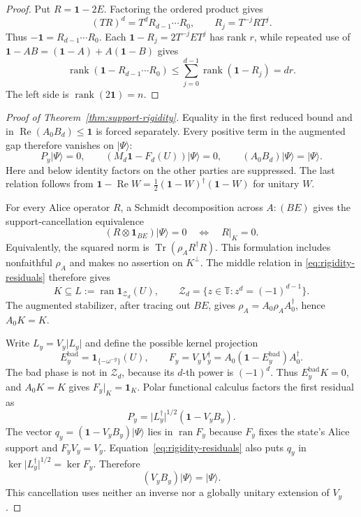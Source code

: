 \documentclass[11pt]{article}
\theoremstyle{definition}
\theoremstyle{remark}
\newcommand{\Id}{\mathbf 1}
\newcommand{\Reop}{\operatorname{Re}}
\newcommand{\Tr}{\operatorname{Tr}}
\newcommand{\rankop}{\operatorname{rank}}
\newcommand{\bbT}{\mathbb T}
\newcommand{\absop}[1]{\lvert #1\rvert}
\begin{document}
\begin{proof}
Put \(R=\Id-2E\).  Factoring the ordered product gives
\[
 (TR)^d=T^dR_{d-1}\cdots R_0,
 \qquad R_j=T^{-j}RT^j.
\]
Thus \(-\Id=R_{d-1}\cdots R_0\).  Each
\(\Id-R_j=2T^{-j}ET^j\) has rank \(r\), while repeated use of
\(\Id-AB=(\Id-A)+A(\Id-B)\) gives
\[
 \rankop(\Id-R_{d-1}\cdots R_0)
 \leq\sum_{j=0}^{d-1}\rankop(\Id-R_j)=dr.
\]
The left side is \(\rankop(2\Id)=n\).
\end{proof}

\begin{proof}[Proof of Theorem~\ref{thm:support-rigidity}]
Equality in the first reduced bound and in
\(\Reop(A_0B_d)\leq\Id\) is forced separately.  Every positive term in
the augmented gap therefore vanishes on \(\lvert\Psi\rangle\):
\begin{equation}
 P_y\lvert\Psi\rangle=0,
 \qquad
 (M_d\Id-F_d(U))\lvert\Psi\rangle=0,
 \qquad
 (A_0B_d)\lvert\Psi\rangle=\lvert\Psi\rangle.
 \label{eq:rigidity-residuals}
\end{equation}
Here and below identity factors on the other parties are suppressed.  The
last relation follows from
\(
 \Id-\Reop W=\tfrac12(\Id-W)^\dagger(\Id-W)
\)
for unitary \(W\).

For every Alice operator \(R\), a Schmidt decomposition across
\(A:(BE)\) gives the support-cancellation equivalence
\begin{equation}
 (R\otimes\Id_{BE})\lvert\Psi\rangle=0
 \quad\Longleftrightarrow\quad R|_K=0.
 \label{eq:support-cancellation}
\end{equation}
Equivalently, the squared norm is
\(\Tr(\rho_AR^\dagger R)\).  This formulation includes nonfaithful
\(\rho_A\) and makes no assertion on \(K^\perp\).
The middle relation in \eqref{eq:rigidity-residuals} therefore gives
\[
 K\subseteq L:=\operatorname{ran}\mathbf1_{\mathcal Z_d}(U),
 \qquad
 \mathcal Z_d=\{z\in\bbT:z^d=(-1)^{d-1}\}.
\]
The augmented stabilizer, after tracing out \(BE\), gives
\(\rho_A=A_0\rho_AA_0^\dagger\), hence \(A_0K=K\).

Write \(L_y=V_y\absop{L_y}\) and define the possible kernel projection
\[
 E_y^{\mathrm{bad}}=\mathbf1_{\{-\omega^{-y}\}}(U),
 \qquad
 F_y=V_yV_y^\dagger
 =A_0(\Id-E_y^{\mathrm{bad}})A_0^\dagger.
\]
The bad phase is not in \(\mathcal Z_d\), because its \(d\)-th power is
\((-1)^d\).  Thus \(E_y^{\mathrm{bad}}K=0\), and \(A_0K=K\) gives
\(F_y|_K=\Id_K\).  Polar functional calculus factors the first residual as
\[
 P_y=\absop{L_y^\dagger}^{1/2}(\Id-V_yB_y).
\]
The vector
\(q_y=(\Id-V_yB_y)\lvert\Psi\rangle\) lies in
\(\operatorname{ran}F_y\) because \(F_y\) fixes the state's Alice support
and \(F_yV_y=V_y\).  Equation~\eqref{eq:rigidity-residuals} also puts
\(q_y\) in \(\ker\absop{L_y^\dagger}^{1/2}=\ker F_y\).  Therefore
\begin{equation}
 (V_yB_y)\lvert\Psi\rangle=\lvert\Psi\rangle.
 \label{eq:polar-stabilizer}
\end{equation}
This cancellation uses neither an inverse nor a globally unitary extension
of \(V_y\).


\end{proof}
\end{document}
